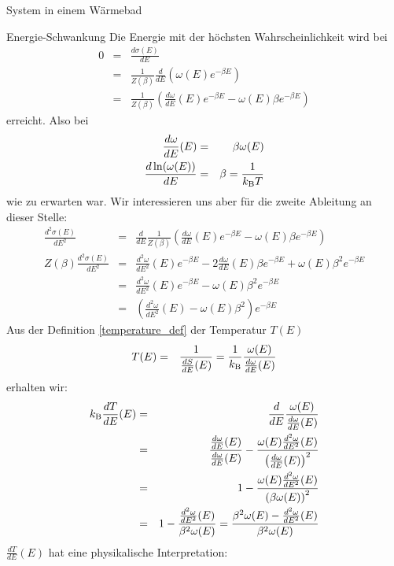 \begin{chapter}{\titlestr}
\begin{section}{System in einem Wärmebad}
\begin{subsection}{Energie-Schwankung}
Die Energie mit der höchsten Wahrscheinlichkeit wird bei
\begin{eqnarray*}
0 &=& \frac{d\sigma(E)}{dE}\\
&=&\frac{1}{Z(\beta)}\frac{d}{dE}\left(\omega(E)e^{-\beta E}\right)\\
&=&\frac{1}{Z(\beta)}\left(\frac{d\omega}{dE}(E)e^{-\beta E}-\omega(E)\beta e^{-\beta E}\right)
\end{eqnarray*}
erreicht. Also bei
\begin{eqnarray*}
\frac{d\omega}{dE}(E) &=& \beta\omega(E)\\
\frac{d \ln(\omega(E))}{dE} &=& \beta = \frac{1}{k_{\mathrm{B}} T}
\end{eqnarray*}
wie zu erwarten war. Wir interessieren uns aber für die zweite Ableitung an dieser Stelle:
\begin{eqnarray*}
\frac{d^2\sigma(E)}{dE^2}
&=&\frac{d}{dE}\frac{1}{Z(\beta)}\left(\frac{d\omega}{dE}(E)e^{-\beta E}-\omega(E)\beta e^{-\beta E}\right)\\
Z(\beta)\frac{d^2\sigma(E)}{dE^2} &=&\frac{d^2\omega}{dE^2}(E)e^{-\beta E}
-2\frac{d\omega}{dE}(E)\beta e^{-\beta E}+\omega(E)\beta^2 e^{-\beta E}\\
&=&\frac{d^2\omega}{dE^2}(E)e^{-\beta E}-\omega(E)\beta^2 e^{-\beta E}\\
&=&\left(\frac{d^2\omega}{dE^2}(E)-\omega(E)\beta^2 \right)e^{-\beta E}
\end{eqnarray*}
Aus der Definition \ref{temperature_def} der Temperatur $T(E)$
\begin{eqnarray*}
T(E) &=& \frac{1}{\frac{dS}{dE}(E)}=\frac{1}{k_{\mathrm{B}} }\frac{\omega(E)}{\frac{d\omega}{dE}(E)}
\end{eqnarray*}
erhalten wir:
\begin{eqnarray*}
k_{\mathrm{B}} \frac{dT}{dE}(E) &=& \frac{d}{dE}\frac{\omega(E)}{\frac{d\omega}{dE}(E)}\\
&=& \frac{\frac{d\omega}{dE}(E)}{\frac{d\omega}{dE}(E)}-\frac{\omega(E)\frac{d^2\omega}{dE^2}(E)}{\left(\frac{d\omega}{dE}(E)\right)^2}\\
&=& 1 -\frac{\omega(E)\frac{d^2\omega}{dE^2}(E)}{\left(\beta\omega(E)\right)^2}\\
&=& 1 -\frac{\frac{d^2\omega}{dE^2}(E)}{\beta^2\omega(E)}=\frac{\beta^2\omega(E)-\frac{d^2\omega}{dE^2}(E)}{\beta^2\omega(E)}
\end{eqnarray*}
$\frac{dT}{dE}(E)$ hat eine physikalische Interpretation:
\begin{eqnarray*}

\end{eqnarray*}
\end{subsection}
\end{section}
\end{chapter}
